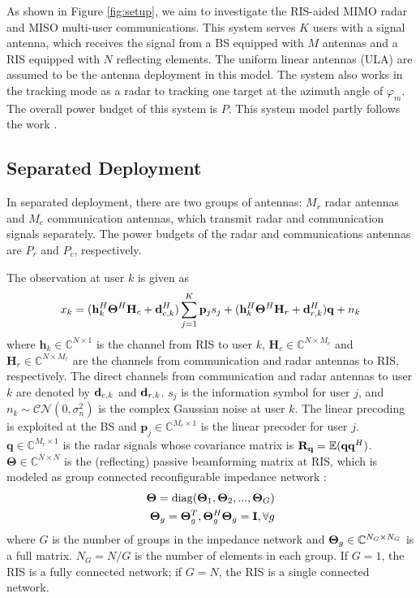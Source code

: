 As shown in Figure \ref{fig:setup}, we aim to investigate the RIS-aided MIMO radar
and MISO multi-user communications. This system serves $K$ users with a signal antenna, which receives
the signal from a BS equipped with $M$ antennas and a RIS equipped with $N$ reflecting elements.
The uniform linear antennas (ULA) are assumed to be the antenna deployment in this model.
The system also works in the tracking mode as a radar to tracking one target at the azimuth 
angle of $\varphi_m$. The overall power budget of this system is $P$. This system model partly follows the work \cite{xu2020tradeoff}.

\subsection{Separated Deployment}

In separated deployment, there are two groups of antennas: $M_r$ radar antennas and $M_c$ communication antennas, which transmit 
radar and communication signals separately. The power budgets of the radar and communications antennas are
$P_r$ and $P_c$, respectively.

The observation at user $k$ is given as
\begin{equation}
    x_k = (\mathbf{h}_k^H \mathbf{\Theta}^H \mathbf{H}_c + {\bf d}_{c,k}^H) \sum_{j=1}^K \mathbf{p}_j s_j + (\mathbf{h}_k^H \mathbf{\Theta}^H \mathbf{H}_r + {\bf d}_{r,k}^H) \mathbf{q} + n_k \label{eq1}
\end{equation}
where $\mathbf{h}_k \in \mathbb{C}^{N \times 1}$ is the channel from
RIS to user $k$, $\mathbf{H}_c \in \mathbb{C}^{N \times M_c}$ and $\mathbf{H}_r \in \mathbb{C}^{N \times M_r}$
are the channels from communication and radar antennas to RIS, respectively. The direct channels from communication 
and radar antennas to user $k$ are denoted by ${\bf d}_{c,k}$ and ${\bf d}_{r,k}$. $s_j$ is the 
information symbol for user $j$, and $n_k \sim \mathcal{CN}(0,\sigma_n^2)$ is the complex 
Gaussian noise at user $k$. The linear precoding
is exploited at the BS and $\mathbf{p}_j \in \mathbb{C}^{M_c \times 1}$ is the linear 
precoder for user $j$. $\mathbf{q} \in \mathbb{C}^{M_r \times 1}$ is the radar signals whose 
covariance matrix is ${\bf{R}}_{\bf q} = \mathbb{E}({\bf{q}}{\bf{q}}^H)$. 
$\mathbf{\Theta} \in \mathbb{C}^{N \times N}$ is the (reflecting) passive beamforming matrix at RIS,
which is modeled as group connected reconfigurable impedance network \cite{shen2020modeling}: 
\begin{align}
    {\bf \Theta} = \mathrm{diag}({\bf \Theta}_1,{\bf \Theta}_2,...,{\bf \Theta}_G) 
    \\ {\bf \Theta}_g = {\bf \Theta}_g^T, {\bf \Theta}_g^H{\bf \Theta}_g = {\bf I}, \forall g
\end{align}
where $G$ is the number of groups in the impedance network and ${\bf \Theta}_g \in \mathbb{C}^{N_G \times N_G}$ is a full matrix. 
$N_G = N / G$ is the number of elements in each group. If $G=1$, the RIS is a fully 
connected network; if $G=N$, the RIS is a single connected network.

